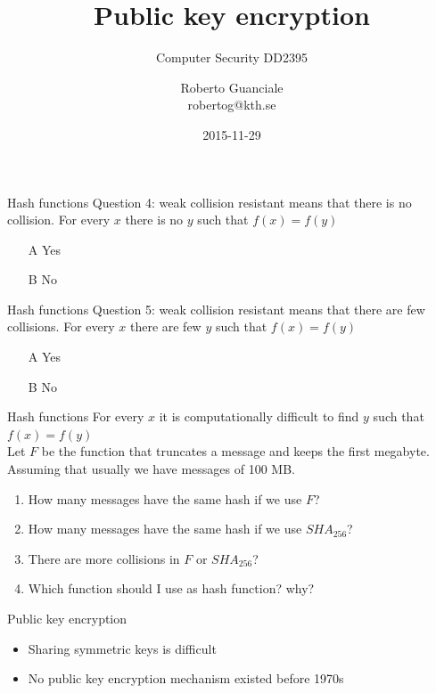 \documentclass{beamer}
\title{Public key encryption}
\subtitle{Computer Security DD2395}
\author[R. Guanciale]{
  Roberto Guanciale\\
  robertog@kth.se
}
\date{2015-11-29}
\begin{document}
\begin{frame}[plain]
  \titlepage
\end{frame}

\begin{frame}{Hash functions}
  Question 4: weak collision resistant means that there is no collision.
  For every $x$ there is no $y$ such that $f(x)=f(y)$
  \begin{itemize}
    \item[A] Yes
    \item[B] No
  \end{itemize}
\end{frame}

\begin{frame}{Hash functions}
  Question 5: weak collision resistant means that there are few collisions.
  For every $x$ there are few $y$ such that $f(x)=f(y)$
  \begin{itemize}
    \item[A] Yes
    \item[B] No
  \end{itemize}
\end{frame}

\begin{frame}{Hash functions}
  For every $x$ \alert{it is computationally difficult to find} $y$
  such that $f(x)=f(y)$\\[10pt]
  Let $F$ be the function that truncates a message and keeps the first megabyte.
  Assuming that usually we have messages of 100 MB.\\
  \begin{enumerate}
    \item How many messages have the same hash if we use $F$?
    \item How many messages have the same hash if we use $SHA_{256}$?
    \item There are more collisions in $F$ or $SHA_{256}$?
    \item Which function should I use as hash function? why?
  \end{enumerate}
\end{frame}

\begin{frame}{Public key encryption}
  \begin{itemize}
    \item Sharing symmetric keys is difficult
    \item No public key  encryption mechanism existed before 1970s
  \end{itemize}
\end{frame}
\end{document}

